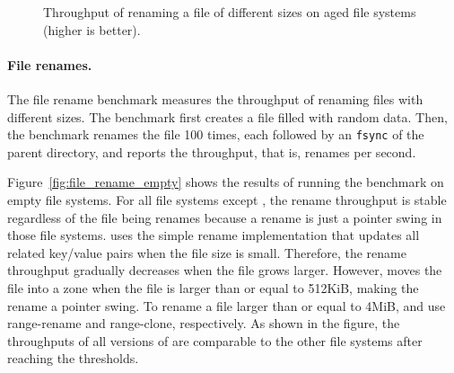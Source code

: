 \begin{figure}[t]
    \centering
    \caption[File rename benchmark on aged file systems]{\label{fig:file_rename_aged}
        Throughput of renaming a file of different sizes on aged file systems (higher is better).}
\end{figure}

\paragraph{File renames.}
The file rename benchmark measures the throughput of renaming files with
different sizes.
The benchmark first creates a file filled with random data.
Then, the benchmark renames the file 100 times,
each followed by an \texttt{fsync} of the parent directory,
and reports the throughput, that is, renames per second.

Figure~\ref{fig:file_rename_empty} shows the results of running the benchmark on
empty file systems.
For all file systems except \betrfs, the rename throughput is stable regardless
of the file being renames because a rename is just a pointer swing in those
file systems.
\betrfs uses the simple rename implementation that updates all related key/value
pairs when the file size is small.
Therefore, the rename throughput gradually decreases when the file grows larger.
However, \betrfsThree moves the file into a zone when the file is larger
than or equal to 512KiB, making the rename a pointer swing.
To rename a file larger than or equal to 4MiB,
\betrfsFour and \betrfsFive use range-rename and range-clone, respectively.
As shown in the figure,
the throughputs of all versions of \betrfs
are comparable to the other file systems after reaching the thresholds.


